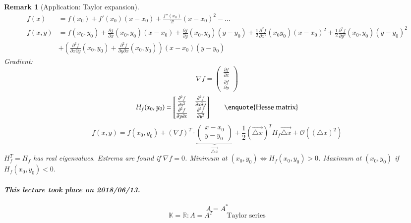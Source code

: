 \documentclass{article}
\newtheorem{remark}{Remark}  \numberwithin{remark}{section}
\newcommand{\dateref}[1]{\paragraph{\textit{This lecture took place on #1.}}}
\begin{document}
\begin{remark}[Application: Taylor expansion]
  \begin{align*}
    f(x) &= f(x_0) + f'(x_0)(x - x_0) + \frac{f''(x_0)}{2!} (x - x_0)^2 - \dots \\
    f(x,y) &= f(x_0, y_0) + \frac{\partial f}{\partial x} (x_0, y_0)(x - x_0) + \frac{\partial f}{\partial y} (x_0, y_0)(y - y_0) + \frac12 \frac{\partial^2 f}{\partial x^2} (x_0 y_0)(x - x_0)^2 + \frac12 \frac{\partial^2 f}{\partial y^2} (x_0, y_0) (y - y_0)^2 \\
      &+ \left(\frac{\partial^2 f}{\partial x \partial y} (x_0, y_0) + \frac{\partial^2 f}{\partial y \partial x} (x_0, y_0)\right) (x - x_0) (y - y_0)
  \end{align*}
  Gradient:
  \[ \nabla f = \begin{pmatrix} \frac{\partial f}{\partial x} \\ \frac{\partial f}{\partial y} \end{pmatrix} \]
  \[ H_f(x_0, y_0) = \begin{bmatrix}
      \frac{\partial^2 f}{\partial x^2} & \frac{\partial^2 f}{\partial x \partial y} \\
      \frac{\partial^2 f}{\partial y \partial x} & \frac{\partial^2 f}{\partial y^2}
    \end{bmatrix} \qquad \text{\enquote{Hesse matrix}}
  \] \[
    f(x, y) = f(x_0, y_0) + (\nabla f)^T \cdot \underbrace{\begin{pmatrix} x - x_0 \\ y - y_0 \end{pmatrix}}_{\vec{\triangle x}}
    + \frac12 (\vec{\triangle x})^T H_f \vec{\triangle x} + \mathcal O((\triangle x)^2)
  \]
  $H_f^T = H_f$ has real eigenvalues. Extrema are found if $\nabla f = 0$.
  Minimum at $(x_0, y_0) \iff H_f(x_0, y_0) > 0$. Maximum at $(x_0, y_0)$ if $H_f(x_0, y_0) < 0$.
\end{remark}

\dateref{2018/06/13}

\[ A = A^* \]
\[ \mathbb K = \mathbb R: A = A^T \qquad \text{Taylor series} \]
\end{document}
